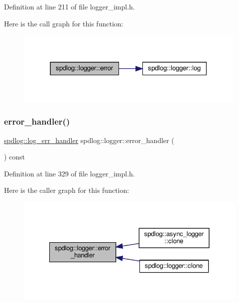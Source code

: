 Definition at line 211 of file logger\+\_\+impl.\+h.

Here is the call graph for this function\+:
\nopagebreak
\begin{figure}[H]
\begin{center}
\leavevmode
\includegraphics[width=315pt]{classspdlog_1_1logger_a9ce73acaa12b7dbbecde6ac3bc7353e5_cgraph}
\end{center}
\end{figure}
\mbox{\label{classspdlog_1_1logger_ac6c864952112a3bbe4084884cc1d64a1}} 
\subsubsection{\texorpdfstring{error\+\_\+handler()}{error\_handler()}}
{\footnotesize\ttfamily \hyperlink{namespacespdlog_ad3ed787a29f245c833ef66faf48036e2}{spdlog\+::log\+\_\+err\+\_\+handler} spdlog\+::logger\+::error\+\_\+handler (\begin{DoxyParamCaption}{ }\end{DoxyParamCaption}) const\hspace{0.3cm}{\ttfamily [inline]}}



Definition at line 329 of file logger\+\_\+impl.\+h.

Here is the caller graph for this function\+:
\nopagebreak
\begin{figure}[H]
\begin{center}
\leavevmode
\includegraphics[width=328pt]{classspdlog_1_1logger_ac6c864952112a3bbe4084884cc1d64a1_icgraph}
\end{center}
\end{figure}
\mbox{\label{classspdlog_1_1logger_a861bb4d4e65de07966148822075bee86}} 
